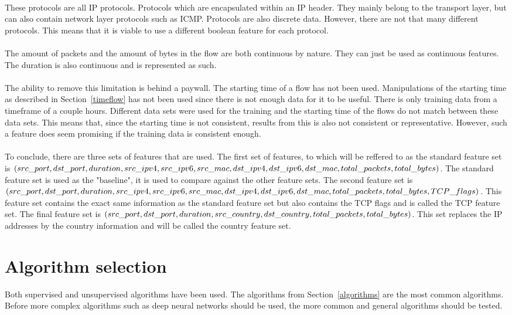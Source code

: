 \\
These protocols are all IP protocols. Protocols which are encapsulated within an IP header. They mainly belong to the transport layer, but can also contain network layer protocols such as ICMP. Protocols are also discrete data. However, there are not that many different protocols. This means that it is viable to use a different boolean feature for each protocol. \\
\\
The amount of packets and the amount of bytes in the flow are both continuous by nature. They can just be used as continuous features. The duration is also continuous and is represented as such.\\
\\
The ability to remove this limitation is behind a paywall. The starting time of a flow has not been used. Manipulations of the starting time as described in Section~\ref{timeflow} has not been used since there is not enough data for it to be useful. There is only training data from a timeframe of a couple hours. Different data sets were used for the training and the starting time of the flows do not match between these data sets. This means that, since the starting time is not consistent, results from this is also not consistent or representative. However, such a feature does seem promising if the training data is consistent enough. \\
\\
To conclude, there are three sets of features that are used. The first set of features, to which will be reffered to as the standard feature set is $(src\_port, dst\_port, duration, src\_ipv4, src\_ipv6, src\_mac, dst\_ipv4, \\ dst\_ipv6, dst\_mac, total\_packets, total\_bytes)$. The standard feature set is used as the "baseline", it is used to compare against the other feature sets. The second feature set is $(src\_port, dst\_port, duration, \\ src\_ipv4, src\_ipv6, src\_mac, dst\_ipv4, dst\_ipv6, dst\_mac, total\_packets, total\_bytes, TCP\_flags)$. This feature set contains the exact same information as the standard feature set but also contains the TCP flags and is called the TCP feature set. The final feature set is $(src\_port, dst\_port, duration, src\_country, \\dst\_country, total\_packets, total\_bytes)$. This set replaces the IP addresses by the country information and  will be called the country feature set.

\section{Algorithm selection}
Both supervised and unsupervised algorithms have been used. The algorithms from Section~\ref{algorithms} are the most common algorithms. Before more complex algorithms such as deep neural networks should be used, the more common and general algorithms should be tested. 

